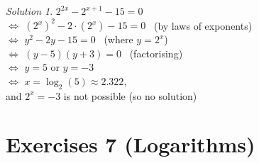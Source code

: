 \documentclass[
  12pt,
  oneside]{book}
\theoremstyle{definition}
\theoremstyle{definition}
\theoremstyle{definition}
\theoremstyle{definition}
\theoremstyle{remark}
\newtheorem*{solution}{Solution}
\begin{document}
\begin{solution}
\(2^{2x}-2^{x+1}-15=0\)\\
\(\iff\) \(\left(2^x\right)^2-2\cdot\left(2^x\right)-15=0\) \hfill~{(by laws of exponents)}\\
\(\iff\) \(y^2 -2y-15=0\) \hfill~{(where \(y=2^x\))}\\
\(\iff\) \((y-5)(y+3)=0\) \hfill~{(factorising)}\\
\(\iff\) \(y=5\) or \(y=-3\)\\
\(\iff\) \(x=\log_2(5)\approx 2.322\),\\
and \(2^x=-3\) is not possible (so no solution)
\end{solution}

\hypertarget{exercises-7-logarithms}{%
\chapter*{Exercises 7 (Logarithms)}\label{exercises-7-logarithms}}
\end{document}
